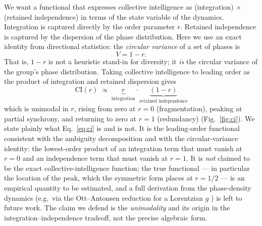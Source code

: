\documentclass[11pt]{article}
\begin{document}
We want a functional that expresses collective intelligence as (integration) $\times$ (retained independence) in terms of the state variable of the dynamics. Integration is captured directly by the order parameter $r$. Retained independence is captured by the dispersion of the phase distribution. Here we use an exact identity from directional statistics: the \emph{circular variance} of a set of phases is \citep{mardia2000directional}
\begin{equation}
V = 1 - r.
\end{equation}
That is, $1-r$ is not a heuristic stand-in for diversity; it \emph{is} the circular variance of the group's phase distribution. Taking collective intelligence to leading order as the product of integration and retained dispersion gives
\begin{equation}
\boxed{\;\mathrm{CI}(r) \;\propto\; \underbrace{r}_{\text{integration}} \cdot \underbrace{(1-r)}_{\text{retained independence}}\;}
\label{eq:ci}
\end{equation}
which is unimodal in $r$, rising from zero at $r=0$ (fragmentation), peaking at partial synchrony, and returning to zero at $r=1$ (redundancy) (Fig.~\ref{fig:ci}). We state plainly what Eq.~\eqref{eq:ci} is and is not. It is the leading-order functional consistent with the ambiguity decomposition and with the circular-variance identity: the lowest-order product of an integration term that must vanish at $r=0$ and an independence term that must vanish at $r=1$. It is \emph{not} claimed to be the exact collective-intelligence function; the true functional --- in particular the location of the peak, which the symmetric form places at $r=1/2$ --- is an empirical quantity to be estimated, and a full derivation from the phase-density dynamics (e.g.\ via the Ott--Antonsen reduction for a Lorentzian $g$ \citep{ott2008low}) is left to future work. The claim we defend is the \emph{unimodality} and its origin in the integration--independence tradeoff, not the precise algebraic form.
\end{document}
